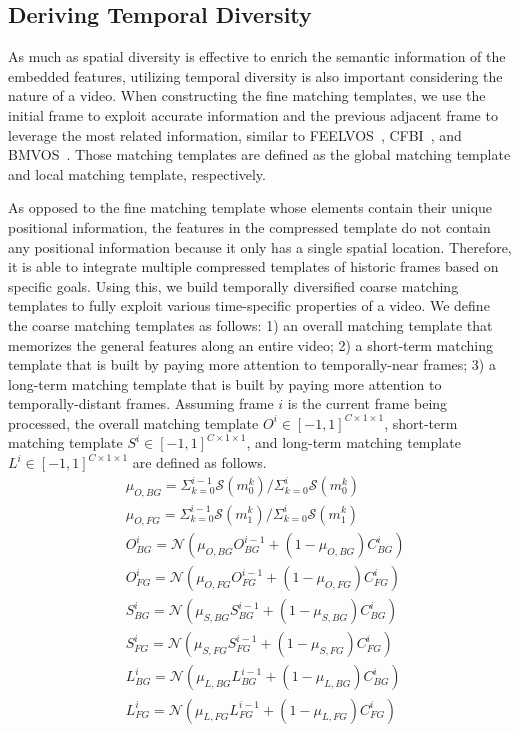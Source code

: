 \documentclass[runningheads]{llncs}
\begin{document}
\subsection{Deriving Temporal Diversity}
As much as spatial diversity is effective to enrich the semantic information of the embedded features, utilizing temporal diversity is also important considering the nature of a video. When constructing the fine matching templates, we use the initial frame to exploit accurate information and the previous adjacent frame to leverage the most related information, similar to FEELVOS~\cite{FEELVOS}, CFBI~\cite{CFBI}, and BMVOS~\cite{BMVOS}. Those matching templates are defined as the global matching template and local matching template, respectively. 


As opposed to the fine matching template whose elements contain their unique positional information, the features in the compressed template do not contain any positional information because it only has a single spatial location. Therefore, it is able to integrate multiple compressed templates of historic frames based on specific goals. Using this, we build temporally diversified coarse matching templates to fully exploit various time-specific properties of a video. We define the coarse matching templates as follows: 1) an overall matching template that memorizes the general features along an entire video; 2) a short-term matching template that is built by paying more attention to temporally-near frames; 3) a long-term matching template that is built by paying more attention to temporally-distant frames. Assuming frame $i$ is the current frame being processed, the overall matching template $O^i \in [-1,1]^{C \times 1 \times 1}$, short-term matching template $S^i \in [-1,1]^{C \times 1 \times 1}$, and long-term matching template $L^i \in [-1,1]^{C \times 1 \times 1}$ are defined as follows.
\begin{eqnarray}
&\mu_{O,BG} = \Sigma^{i-1}_{k=0} \mathcal{S}\left(m^k_0\right) / \Sigma^{i}_{k=0} \mathcal{S}\left(m^k_0\right)\nonumber\\
&\mu_{O,FG} = \Sigma^{i-1}_{k=0} \mathcal{S}\left(m^k_1\right) / \Sigma^{i}_{k=0} \mathcal{S}\left(m^k_1\right)\nonumber\\[2pt]
&O^i_{BG} = \mathcal{N}\left(\mu_{O,BG} O^{i-1}_{BG} + \left(1 - \mu_{O,BG}\right) C^i_{BG}\right)\nonumber\\
&O^i_{FG} = \mathcal{N}\left(\mu_{O,FG} O^{i-1}_{FG} + \left(1 - \mu_{O,FG}\right) C^i_{FG}\right)\\[15pt]
&S^i_{BG} = \mathcal{N}\left(\mu_{S,BG} S^{i-1}_{BG} + \left(1 - \mu_{S,BG}\right) C^i_{BG}\right)\nonumber\\
&S^i_{FG} = \mathcal{N}\left(\mu_{S,FG} S^{i-1}_{FG} + \left(1 - \mu_{S,FG}\right) C^i_{FG}\right)\\[15pt]
&L^i_{BG} = \mathcal{N}\left(\mu_{L,BG} L^{i-1}_{BG} + \left(1 - \mu_{L,BG}\right) C^i_{BG}\right)\nonumber\\
&L^i_{FG} = \mathcal{N}\left(\mu_{L,FG} L^{i-1}_{FG} + \left(1 - \mu_{L,FG}\right) C^i_{FG}\right)
\end{eqnarray}
\end{document}
